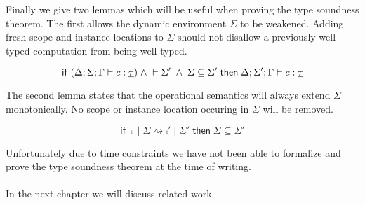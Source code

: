 {Finally we give two lemmas which will be useful when proving the type soundness theorem.
The first allows the dynamic environment $\Sigma$ to be weakened.
Adding fresh scope and instance locations to $\Sigma$ should not disallow a previously well-typed computation from being well-typed.

\begin{lemma}
\[
	\mathsf{if}\;
		(\Delta;\Sigma;\Gamma \vdash c : \underline{\tau})
		\;\land\;
		\vdash \Sigma'
		\;\land\;
		\Sigma \subseteq \Sigma'
	\;\mathsf{then}\;
		\Delta;\Sigma';\Gamma \vdash c : \underline{\tau}
\]
\end{lemma}

The second lemma states that the operational semantics will always extend $\Sigma$ monotonically.
No scope or instance location occuring in $\Sigma$ will be removed.

\begin{lemma}
\[
	\mathsf{if}\;
		\comp \;|\; \Sigma \rightsquigarrow \comp' \;|\; \Sigma'
	\;\mathsf{then}\;
		\Sigma \subseteq \Sigma'
\]
\end{lemma}

Unfortunately due to time constraints we have not been able to formalize and prove the type soundness theorem at the time of writing.
\\\\
In the next chapter we will discuss related work.

}
